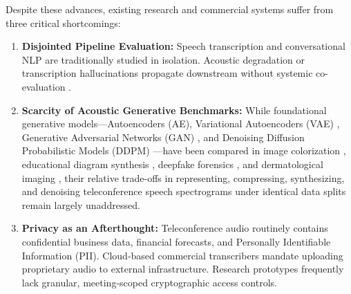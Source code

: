 \documentclass[conference]{IEEEtran}
\begin{document}
Despite these advances, existing research and commercial systems suffer from three critical shortcomings:
\begin{enumerate}
    \item \textbf{Disjointed Pipeline Evaluation:} Speech transcription and conversational NLP are traditionally studied in isolation. Acoustic degradation or transcription hallucinations propagate downstream without systemic co-evaluation \cite{zhu2020hmnet, zhong2021qmsum}.
    \item \textbf{Scarcity of Acoustic Generative Benchmarks:} While foundational generative models---Autoencoders (AE), Variational Autoencoders (VAE) \cite{kingma2014vae}, Generative Adversarial Networks (GAN) \cite{goodfellow2014gan}, and Denoising Diffusion Probabilistic Models (DDPM) \cite{ho2020ddpm, song2021ddim}---have been compared in image colorization \cite{mane2026colorization}, educational diagram synthesis \cite{mane2026edugen}, deepfake forensics \cite{mane2026deepfake}, and dermatological imaging \cite{kharkate2026skin}, their relative trade-offs in representing, compressing, synthesizing, and denoising teleconference speech spectrograms under identical data splits remain largely unaddressed.
    \item \textbf{Privacy as an Afterthought:} Teleconference audio routinely contains confidential business data, financial forecasts, and Personally Identifiable Information (PII). Cloud-based commercial transcribers mandate uploading proprietary audio to external infrastructure. Research prototypes frequently lack granular, meeting-scoped cryptographic access controls.
\end{enumerate}
\end{document}
